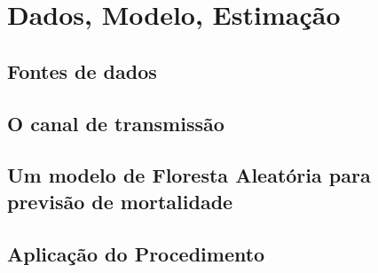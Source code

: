 

\chapter{Dados, Modelo, Estimação}

\section{Fontes de dados}

\section{O canal de transmissão}

\section{Um modelo de Floresta Aleatória para previsão de mortalidade}

\section{Aplicação do Procedimento}
